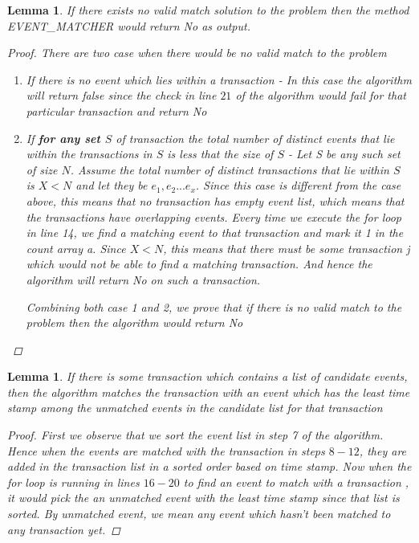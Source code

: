 \documentclass[12pt]{article}
\newtheorem{lemma}[theorem]{Lemma}
\begin{document}
\begin{lemma} If there exists no valid match solution to the problem then the method EVENT\_MATCHER would return No as output.
\begin{proof} There are two case when there would be no valid match to the problem
\begin{enumerate}
\item If there is no event which lies within a transaction - In this case the algorithm will return false since the check in line $21$ of the algorithm would fail for that particular transaction and return No
\item If \textbf{for any set $S$} of transaction the total number of distinct events that lie within the transactions in $S$ is less that the size of $S$ - Let S be any such set of size $N$. Assume the total number of distinct transactions that lie within $S$ is $X < N$ and let they be $e_1, e_2 ... e_x$. Since this case is different from the case above, this means that no transaction has empty event list, which means that the transactions have overlapping events. Every time we execute the for loop in line 14, we find a matching event to that transaction and mark it 1 in the count array a. Since $X<N$, this means that there must be some transaction j which would not be able to find a matching transaction. And hence the algorithm will return No on such a transaction.

Combining both case 1 and 2, we prove that if there is no valid match to the problem then the algorithm would return No
\end{enumerate}
\end{proof}
\end{lemma}

\begin{lemma}
If there is some transaction which contains a list of candidate events, then the algorithm matches the transaction with an event which has the least time stamp among the unmatched events in the candidate list for that transaction
\begin{proof}
First we observe that we sort the event list in step 7 of the algorithm. Hence when the events are matched with the transaction in steps $8-12$, they are added in the transaction list in a sorted order based on time stamp. Now when the for loop is running in lines $16-20$ to find an event to match with a transaction , it would pick the an unmatched event with the least time stamp since that list is sorted. By unmatched event, we mean any event which hasn't been matched to any transaction yet.
\end{proof}
\end{lemma}
\end{document}
